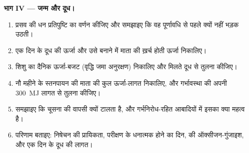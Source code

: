 \begin{problem}
\medskip
\noindent\textbf{भाग IV --- जन्म और दूध।}
\begin{enumerate}[resume]
  \item प्रसव की धन प्रतिपुष्टि का वर्णन कीजिए और समझाइए कि वह
        पूर्णावधि से पहले क्यों नहीं भड़क उठती।
  \item एक दिन के दूध की ऊर्जा और उसे बनाने में माता की ख़र्च होती
        ऊर्जा निकालिए।
  \item शिशु का दैनिक ऊर्जा-बजट (वृद्धि जमा अनुरक्षण) निकालिए और
        मिलते दूध से तुलना कीजिए।
  \item नौ महीने के स्तनपायन की माता की कुल ऊर्जा-लागत निकालिए, और
        गर्भावस्था की अपनी \qty{300}{MJ} लागत से तुलना कीजिए।
  \item समझाइए कि चूसना  की वापसी क्यों टालता है, और
        गर्भनिरोध-रहित आबादियों में इसका क्या महत्व है।
  \item परिणाम बताइए: निषेचन की प्रायिकता, परीक्षण के धनात्मक होने का
        दिन,  की ऑक्सीजन-गुंजाइश, और एक दिन के दूध की
        लागत।
\end{enumerate}
\end{problem}
